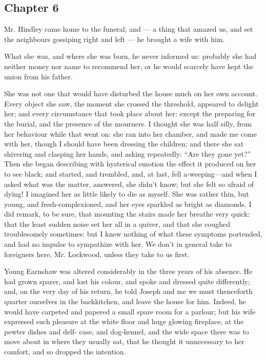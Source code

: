 \subsection*{Chapter 6}

\par Mr. Hindley came home to the funeral; and — a thing that amazed us, and set the neighbours gossiping right and left — he brought a wife with him.
\par What she was, and where she was born, he never informed us: probably she had neither money nor name to recommend her, or he would scarcely have kept the union from his father.
\par She was not one that would have disturbed the house much on her own account. Every object she saw, the moment she crossed the threshold, appeared to delight her; and every circumstance that took place about her: except the preparing for the burial, and the presence of the mourners. I thought she was half silly, from her behaviour while that went on: she ran into her chamber, and made me come with her, though I should have been dressing the children; and there she sat shivering and clasping her hands, and asking repeatedly: “Are they gone yet?” Then she began describing with hysterical emotion the effect it produced on her to see black; and started, and trembled, and, at last, fell a-weeping—and when I asked what was the matter, answered, she didn't know; but she felt so afraid of dying! I imagined her as little likely to die as myself. She was rather thin, but young, and fresh-complexioned, and her eyes sparkled as bright as diamonds. I did remark, to be sure, that mounting the stairs made her breathe very quick: that the least sudden noise set her all in a quiver, and that she coughed troublesomely sometimes: but I knew nothing of what these symptoms portended, and had no impulse to sympathize with her. We don't in general take to foreigners here, Mr. Lockwood, unless they take to us first.
\par Young Earnshaw was altered considerably in the three years of his absence. He had grown sparer, and lost his colour, and spoke and dressed quite differently; and, on the very day of his return, he told Joseph and me we must thenceforth quarter ourselves in the backkitchen, and leave the house for him. Indeed, he would have carpeted and papered a small spare room for a parlour; but his wife expressed such pleasure at the white floor and huge glowing fireplace, at the pewter dishes and delf- case, and dog-kennel, and the wide space there was to move about in where they usually sat, that he thought it unnecessary to her comfort, and so dropped the intention.
